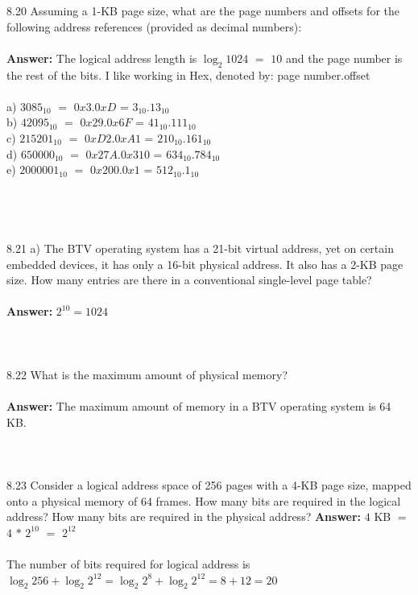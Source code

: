 \documentclass[12pt]{article}
\begin{document}
8.20 Assuming a 1-KB page size, what are the page numbers and offsets for
the following address references (provided as decimal numbers):\\\\
\textbf{Answer: } The logical address length is $\log_2{1024}$ $=$ $10$ and the page number is the 
rest of the bits. I like working in Hex, denoted by: page number$.$offset\\\\
a) $3085_{10}$ $=$ $0x3.0xD$ = $3_{10}.13_{10}$\\
b)  $42095_{10}$ $=$ $0x29.0x6F$ = $41_{10}.111_{10}$\\
c)  $215201_{10}$ $=$ $0xD2.0xA1$ = $210_{10}.161_{10}$\\
d)  $650000_{10}$ $=$ $0x27A.0x310$ = $634_{10}.784_{10}$\\
e)  $2000001_{10}$ $=$ $0x200.0x1$ = $512_{10}.1_{10}$\\
\\\\
\\\\8.21 a) The BTV operating system has a 21-bit virtual address, yet on certain
embedded devices, it has only a 16-bit physical address. It also has a
2-KB page size. How many entries are there in a conventional single-level page table?\\\\
\textbf{Answer: } $2^10 = 1024$
\\\\
\\\\8.22 What is the maximum amount of physical memory?\\\\
\textbf{Answer: } The maximum amount of memory in a BTV operating system is 64 KB.
\\\\
\\\\8.23 Consider a logical address space of 256 pages with a 4-KB page size,
mapped onto a physical memory of 64 frames.  How many bits are required in the logical address?
How many bits are required in the physical address?
\textbf{Answer: } $4$ KB $=$ $4$ $*$ $2^{10}$ $=$ $2^{12}$\\\\
The number of bits required for logical address is $\log_2{256} + 
\log_2{2^{12}} = \log_2{2^8} + \log_2{2^{12}} = 8 + 12 = 20$\\\\
\end{document}
